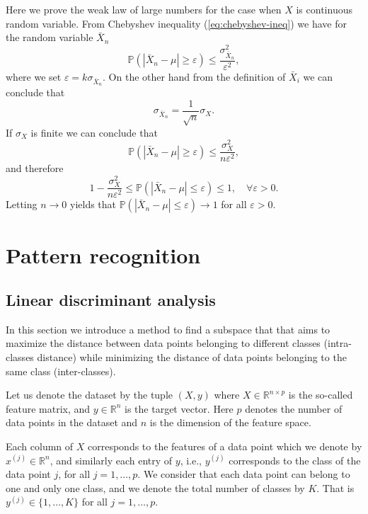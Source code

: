 \documentclass[11pt]{article}
\newcommand{\R}{\mathbb{R}}
\newcommand{\Pro}{\mathbb{P}}
\begin{document}
Here we prove the weak law of large numbers for the case when $X$ is
continuous random variable. From Chebyshev inequality
(\ref{eq:chebyshev-ineq}) we have for the random variable $\bar{X}_n$
\begin{equation} 
  \Pro(|\bar{X}_n-\mu| \geq \varepsilon) \leq
  \frac{\sigma_{\bar{X}_n}^2}{\varepsilon^2},
\end{equation}
where we set $\varepsilon = k \sigma_{\bar{X}_n}$. On the other hand
from the definition of $\bar{X}_i$ we can conclude that
\begin{equation*}
  \sigma_{\bar{X}_n} = \frac{1}{\sqrt{n}} \sigma_X.
\end{equation*}
If $\sigma_X$ is finite we can conclude that 
\begin{equation*} 
  \Pro(|\bar{X}_n-\mu| \geq \varepsilon) \leq
  \frac{\sigma_{X}^2}{n \varepsilon^2},
\end{equation*}
and therefore
\begin{equation} 
  1- \frac{\sigma_{X}^2}{n \varepsilon^2} \leq
  \Pro(|\bar{X}_n-\mu| \leq \varepsilon) \leq
  1, \quad \forall \varepsilon > 0.
\end{equation}
Letting $n \rightarrow 0$ yields that $ \Pro(|\bar{X}_n-\mu| \leq
\varepsilon) \rightarrow 1$ for all $\varepsilon > 0$.

\section{Pattern recognition}
\subsection{Linear discriminant analysis}
In this section we introduce a method to find a subspace that that aims to maximize the distance between data points belonging to different classes (intra-classes distance) while minimizing the distance of data points belonging to the same class (inter-classes).

Let us denote the dataset by the tuple $(X, y)$ where $X \in \R^{n \times p}$ is the so-called feature matrix, and $y \in \R^{n}$ is the target vector. Here $p$ denotes the number of data points in the dataset and $n$ is the dimension of the feature space. 

Each column of $X$ corresponds to the features of a data point which we denote by $x^{(j)} \in \R^{n}$, and similarly each entry of $y$, i.e., $y^{(j)}$ corresponds to the class of the data point $j$, for all $j=1,\dots, p$. We consider that each data point can belong to one and only one class, and we denote the total number of classes by $K$. That is $y^{(j)} \in \{1,\dots, K\}$ for all $j=1,\dots, p$.
\end{document}
